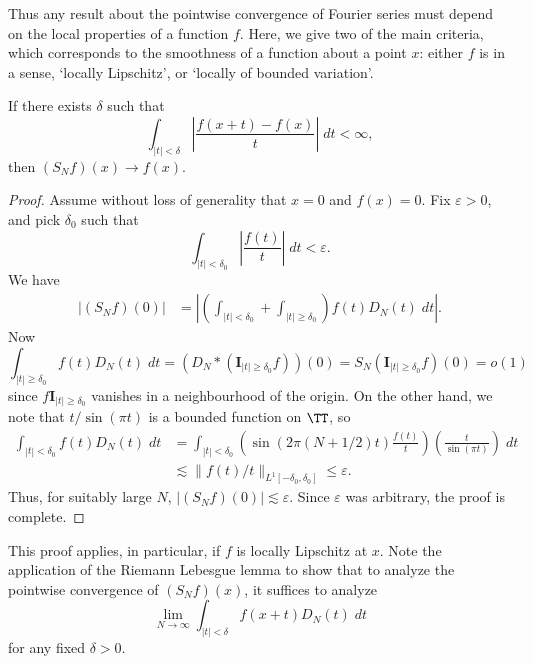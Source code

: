 Thus any result about the pointwise convergence of Fourier series must depend on the local properties of a function $f$. Here, we give two of the main criteria, which corresponds to the smoothness of a function about a point $x$: either $f$ is in a sense, `locally Lipschitz', or `locally of bounded variation'.

\begin{theorem}
    If there exists $\delta$ such that
    \[ \int_{|t| < \delta} \left| \frac{f(x+t) - f(x)}{t} \right|\; dt < \infty, \]
    then $(S_N f)(x) \to f(x)$.
\end{theorem}
\begin{proof}
    Assume without loss of generality that $x = 0$ and $f(x) = 0$. Fix $\varepsilon > 0$, and pick $\delta_0$ such that
    \[ \int_{|t| < \delta_0} \left| \frac{f(t)}{t} \right|\; dt < \varepsilon. \]
    We have
    \begin{align*}
        |(S_N f)(0)| &= \left| \left( \int_{|t| < \delta_0} + \int_{|t| \geq \delta_0} \right) f(t) D_N(t)\; dt \right|.
    \end{align*}
    Now
    \[ \int_{|t| \geq \delta_0} f(t) D_N(t)\; dt = (D_N * \left( \mathbf{I}_{|t| \geq \delta_0} f \right))(0) = S_N( \mathbf{I}_{|t| \geq \delta_0} f )(0) = o(1) \]
    since $f \mathbf{I}_{|t| \geq \delta_0}$ vanishes in a neighbourhood of the origin. On the other hand, we note that $t/\sin(\pi t)$ is a bounded function on $\TT$, so
    \begin{align*}
        \int_{|t| < \delta_0} f(t) D_N(t)\; dt &= \int_{|t| < \delta_0} \left( \sin(2 \pi (N + 1/2)t) \frac{f(t)}{t} \right) \left( \frac{t}{\sin(\pi t)} \right)\; dt\\
        &\lesssim \| f(t)/t \|_{L^1[-\delta_0,\delta_0]} \leq \varepsilon.
    \end{align*}
    Thus, for suitably large $N$, $|(S_N f)(0)| \lesssim \varepsilon$. Since $\varepsilon$ was arbitrary, the proof is complete.
\end{proof}

This proof applies, in particular, if $f$ is locally Lipschitz at $x$. Note the application of the Riemann Lebesgue lemma to show that to analyze the pointwise convergence of $(S_N f)(x)$, it suffices to analyze
%
\[ \lim_{N \to \infty} \int_{|t| < \delta} f(x+t) D_N(t)\; dt \]
%
for any fixed $\delta > 0$.

